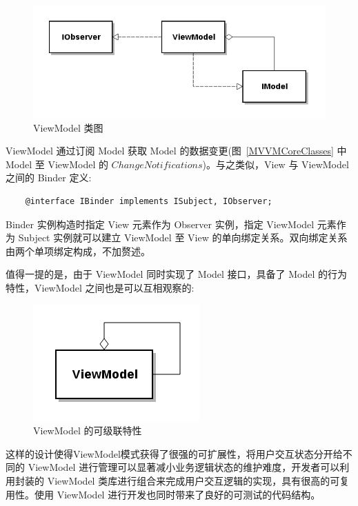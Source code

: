 \begin{figure}[!h]
  \begin{center}
    \includegraphics[scale=0.5]{figures/diagram-viewmodel.png}
    \caption{ViewModel 类图\label{ViewModelClass}}
  \end{center}
\end{figure}

ViewModel 通过订阅 Model 获取 Model 的数据变更(图~\ref{MVVMCoreClasses} 中 Model 至 ViewModel 的 $Change Notifications$)。与之类似，View 与 ViewModel 之间的 Binder 定义:

\begin{verbatim}
    @interface IBinder implements ISubject, IObserver;
\end{verbatim}

Binder 实例构造时指定 View 元素作为 Observer 实例，指定 ViewModel 元素作为 Subject 实例就可以建立 ViewModel 至 View 的单向绑定关系。双向绑定关系由两个单项绑定构成，不加赘述。

值得一提的是，由于 ViewModel 同时实现了 Model 接口，具备了 Model 的行为特性，ViewModel 之间也是可以互相观察的:

\begin{figure}[!h]
  \begin{center}
    \includegraphics[scale=0.5]{figures/diagram-viewmodel-cascading.png}
    \caption{ViewModel 的可级联特性\label{ViewModelCascading}}
  \end{center}
\end{figure}

这样的设计使得ViewModel模式获得了很强的可扩展性，将用户交互状态分开给不同的 ViewModel 进行管理可以显著减小业务逻辑状态的维护难度，开发者可以利用封装的 ViewModel 类库进行组合来完成用户交互逻辑的实现，具有很高的可复用性。使用 ViewModel 进行开发也同时带来了良好的可测试的代码结构。

